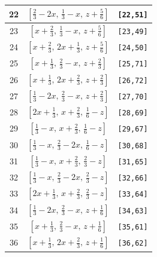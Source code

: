 \documentclass[fleqn,8pt]{jsarticle}
\begin{document}
\begin{longtable}{ccc}
22 & $\left[ \frac{2}{3} - 2 x,\, \frac{1}{3} - x,\, z + \frac{5}{6} \right]$ & {\tt [22,51]} \\ \hline
23 & $\left[ x + \frac{2}{3},\, \frac{1}{3} - x,\, z + \frac{5}{6} \right]$ & {\tt [23,49]} \\ \hline
24 & $\left[ x + \frac{2}{3},\, 2 x + \frac{1}{3},\, z + \frac{5}{6} \right]$ & {\tt [24,50]} \\ \hline
25 & $\left[ x + \frac{1}{3},\, \frac{2}{3} - x,\, z + \frac{2}{3} \right]$ & {\tt [25,71]} \\ \hline
26 & $\left[ x + \frac{1}{3},\, 2 x + \frac{2}{3},\, z + \frac{2}{3} \right]$ & {\tt [26,72]} \\ \hline
27 & $\left[ \frac{1}{3} - 2 x,\, \frac{2}{3} - x,\, z + \frac{2}{3} \right]$ & {\tt [27,70]} \\ \hline
28 & $\left[ 2 x + \frac{1}{3},\, x + \frac{2}{3},\, \frac{1}{6} - z \right]$ & {\tt [28,69]} \\ \hline
29 & $\left[ \frac{1}{3} - x,\, x + \frac{2}{3},\, \frac{1}{6} - z \right]$ & {\tt [29,67]} \\ \hline
30 & $\left[ \frac{1}{3} - x,\, \frac{2}{3} - 2 x,\, \frac{1}{6} - z \right]$ & {\tt [30,68]} \\ \hline
31 & $\left[ \frac{1}{3} - x,\, x + \frac{2}{3},\, \frac{2}{3} - z \right]$ & {\tt [31,65]} \\ \hline
32 & $\left[ \frac{1}{3} - x,\, \frac{2}{3} - 2 x,\, \frac{2}{3} - z \right]$ & {\tt [32,66]} \\ \hline
33 & $\left[ 2 x + \frac{1}{3},\, x + \frac{2}{3},\, \frac{2}{3} - z \right]$ & {\tt [33,64]} \\ \hline
34 & $\left[ \frac{1}{3} - 2 x,\, \frac{2}{3} - x,\, z + \frac{1}{6} \right]$ & {\tt [34,63]} \\ \hline
35 & $\left[ x + \frac{1}{3},\, \frac{2}{3} - x,\, z + \frac{1}{6} \right]$ & {\tt [35,61]} \\ \hline
36 & $\left[ x + \frac{1}{3},\, 2 x + \frac{2}{3},\, z + \frac{1}{6} \right]$ & {\tt [36,62]} \\
\end{longtable}
\renewcommand{\arraystretch}{1.2}
\end{document}
